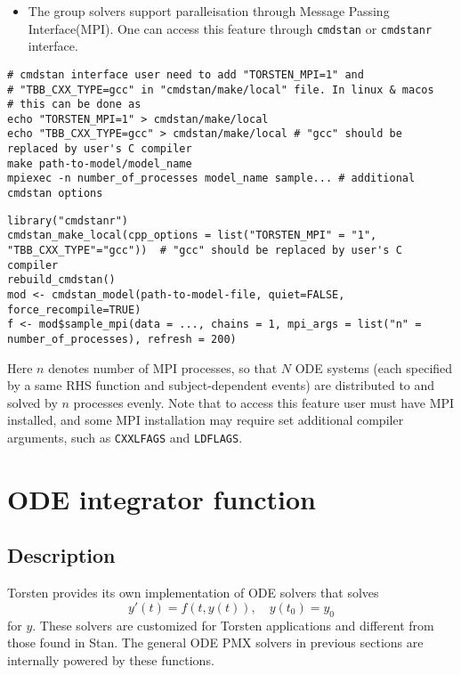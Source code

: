 \documentclass[12pt, reqno, oneside]{amsbook}
\numberwithin{equation}{chapter}
\numberwithin{figure}{chapter}
\numberwithin{table}{chapter}
\theoremstyle{remark}
\begin{document}
\begin{itemize}
\item The group solvers support paralleisation through Message Passing
Interface(MPI). One can access this feature through \texttt{cmdstan} or
\texttt{cmdstanr} interface.
\end{itemize}
\begin{verbatim}
# cmdstan interface user need to add "TORSTEN_MPI=1" and
# "TBB_CXX_TYPE=gcc" in "cmdstan/make/local" file. In linux & macos
# this can be done as
echo "TORSTEN_MPI=1" > cmdstan/make/local
echo "TBB_CXX_TYPE=gcc" > cmdstan/make/local # "gcc" should be replaced by user's C compiler
make path-to-model/model_name
mpiexec -n number_of_processes model_name sample... # additional cmdstan options
\end{verbatim}
\begin{verbatim}
library("cmdstanr")
cmdstan_make_local(cpp_options = list("TORSTEN_MPI" = "1", "TBB_CXX_TYPE"="gcc"))  # "gcc" should be replaced by user's C compiler
rebuild_cmdstan()
mod <- cmdstan_model(path-to-model-file, quiet=FALSE, force_recompile=TRUE)
f <- mod$sample_mpi(data = ..., chains = 1, mpi_args = list("n" = number_of_processes), refresh = 200)
\end{verbatim}
Here \(n\) denotes number of MPI processes, so that \(N\)
ODE systems (each specified by a same RHS function and
subject-dependent events) are distributed to and solved by \(n\)
processes evenly. Note that to access this feature user must have
MPI installed, and some MPI installation may require set additional
compiler arguments, such as \texttt{CXXLFAGS} and \texttt{LDFLAGS}.

\section{ODE  integrator function}
\label{sec:org2654f2a}
\subsection{Description}
\label{sec:orge3aae27}
Torsten provides its own implementation of ODE solvers that solves
\begin{equation*}
  y'(t) = f(t, y(t)), \quad y(t_0) = y_0
\end{equation*}
for \(y\). These solvers
are customized for Torsten applications and different from those found
in Stan. The general ODE PMX solvers in previous sections are internally powered
by these functions.
\end{document}
